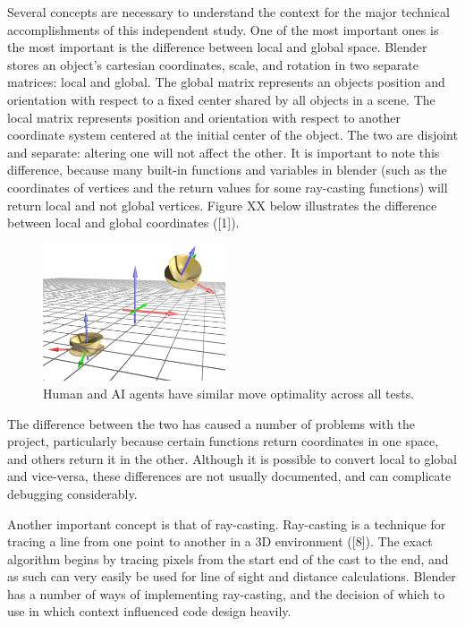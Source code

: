 Several concepts are necessary to understand the context for the major technical accomplishments of this independent study. One of the most important ones is the most important is the difference between local and global space. Blender stores an object's cartesian coordinates, scale, and rotation in two separate matrices: local and global. The global matrix represents an objects position and orientation with respect to a fixed center shared by all objects in a scene. The local matrix represents position and orientation with respect to another coordinate system centered at the initial center of the object. The two are disjoint and separate: altering one will not affect the other. It is important to note this difference, because many built-in functions and variables in blender (such as the coordinates of vertices and the return values for some ray-casting functions) will return local and not global vertices. Figure XX below illustrates the difference between local and global coordinates ([1]).

\begin{figure}
	\begin{center}
		\includegraphics[width=0.48\textwidth]{figures/3dspace.jpg}
	\end{center}
	\caption{Human and AI agents have similar move optimality across all tests.}
\end{figure}

The difference between the two has caused a number of problems with the project, particularly because certain functions return coordinates in one space, and others return it in the other. Although it is possible to convert local to global and vice-versa, these differences are not usually documented, and can complicate debugging considerably.

Another important concept is that of ray-casting. Ray-casting is a technique for tracing a line from one point to another in a 3D environment ([8]). The exact algorithm begins by tracing pixels from the start end of the cast to the end, and as such can very easily be used for line of sight and distance calculations. Blender has a number of ways of implementing ray-casting, and the decision of which to use in which context influenced code design heavily.

